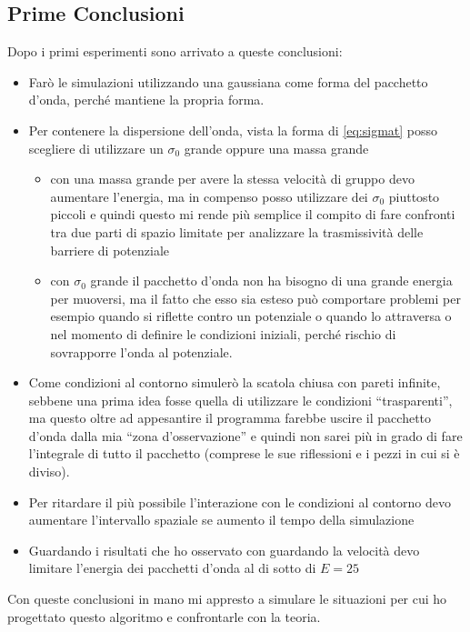 \subsection{Prime Conclusioni}
Dopo i primi esperimenti sono arrivato a queste conclusioni:
\begin{itemize}
\item Far\`o le simulazioni utilizzando una gaussiana come forma del pacchetto d'onda, perch\'e mantiene la propria forma.
\item Per contenere la dispersione dell'onda, vista la forma di \eqref{eq:sigmat} posso scegliere di utilizzare un $\sigma_0$ grande oppure una massa grande
  \begin{itemize}
  \item con una massa grande per avere la stessa velocit\`a di gruppo devo aumentare l'energia, ma in compenso posso utilizzare dei $\sigma_0$ piuttosto piccoli e quindi questo mi rende pi\`u semplice il compito di fare confronti tra due parti di spazio limitate per analizzare la trasmissivit\`a delle barriere di potenziale
  \item con $\sigma_0$ grande il pacchetto d'onda  non ha bisogno di una grande energia per muoversi, ma il fatto che esso sia esteso pu\`o comportare problemi per esempio quando si riflette contro un potenziale o quando lo attraversa o nel momento di definire le condizioni iniziali, perch\'e rischio di sovrapporre l'onda al potenziale.
  \end{itemize}
\item Come condizioni al contorno simuler\`o la scatola chiusa con pareti infinite, sebbene una prima idea fosse quella di utilizzare le condizioni ``trasparenti'', ma questo oltre ad appesantire il programma farebbe uscire il pacchetto d'onda dalla mia ``zona d'osservazione'' e quindi non sarei pi\`u in grado di fare l'integrale di tutto il pacchetto (comprese le sue riflessioni e i pezzi in cui si \`e diviso).
\item Per ritardare il pi\`u possibile l'interazione con le condizioni al contorno devo aumentare l'intervallo spaziale se aumento il tempo della simulazione
\item Guardando i risultati che ho osservato con guardando la velocit\`a devo limitare l'energia dei pacchetti d'onda al di sotto di $E=25$
\end{itemize}

Con queste conclusioni in mano mi appresto a simulare le situazioni per cui ho progettato questo algoritmo e confrontarle con la teoria.
